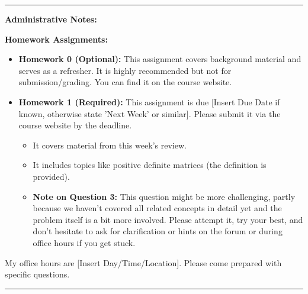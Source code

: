 \documentclass[11pt]{article}
\theoremstyle{definition}
\theoremstyle{remark}
\newenvironment{adminnote}{%
  \par\medskip\noindent\rule{\linewidth}{0.4pt}\par\nobreak\medskip%
  \noindent\textbf{Administrative Notes:}\par\nobreak\smallskip%
}
{%
  \par\medskip\noindent\rule{\linewidth}{0.4pt}\par\nobreak\medskip%
}
\begin{document}
\begin{adminnote}
\textbf{Homework Assignments:}
\begin{itemize}
    \item \textbf{Homework 0 (Optional):} This assignment covers background material and serves as a refresher. It is highly recommended but not for submission/grading. You can find it on the course website.
    \item \textbf{Homework 1 (Required):} This assignment is due [Insert Due Date if known, otherwise state 'Next Week' or similar]. Please submit it via the course website by the deadline.
        \begin{itemize}
            \item It covers material from this week's review.
            \item It includes topics like positive definite matrices (the definition is provided).
            \item \textbf{Note on Question 3:} This question might be more challenging, partly because we haven't covered all related concepts in detail yet and the problem itself is a bit more involved. Please attempt it, try your best, and don't hesitate to ask for clarification or hints on the forum or during office hours if you get stuck.
        \end{itemize}
\end{itemize}
My office hours are [Insert Day/Time/Location]. Please come prepared with specific questions.
\end{adminnote}
\end{document}
